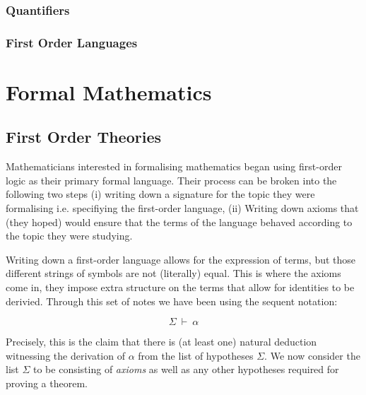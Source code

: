 \documentclass{book}
\begin{document}

        \subsection{Quantifiers}


        \subsection{First Order Languages}

\chapter{Formal Mathematics}

    \newpage
    \section{First Order Theories}

    Mathematicians interested in formalising mathematics began using first-order logic as their primary formal language. Their process can be broken into the following two steps (i) writing down a signature for the topic they were formalising i.e. specifiying the first-order language, (ii) Writing down axioms that (they hoped) would ensure that the terms of the language behaved according to the topic they were studying. 

    Writing down a first-order language allows for the expression of terms, but those different strings of symbols are not (literally) equal. This is where the axioms come in, they impose extra structure on the terms that allow for identities to be derivied. Through this set of notes we have been using the sequent notation: 

    $$\Sigma \ \vdash \ \alpha$$

    Precisely, this is the claim that there is (at least one) natural deduction witnessing the derivation of $\alpha$ from the list of hypotheses $\Sigma$. We now consider the list $\Sigma$ to be consisting of \emph{axioms} as well as any other hypotheses required for proving a theorem. 
\end{document}
